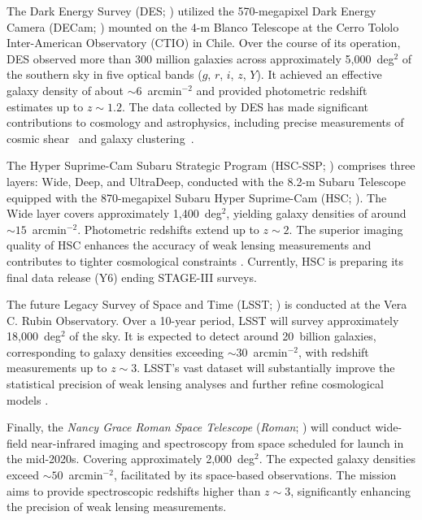 The Dark Energy Survey (DES; \citealt{2005astro.ph.10346T, 2018ApJS..239...18A, 2021ApJS..255...20A}) utilized the 570-megapixel Dark Energy Camera (DECam; \citealt{2015AJ....150..150F}) mounted on the 4-m Blanco Telescope at the Cerro Tololo Inter-American Observatory (CTIO) in Chile. Over the course of its operation, DES observed more than 300 million galaxies across approximately 5,000~deg$^2$ of the southern sky in five optical bands ($g$, $r$, $i$, $z$, $Y$). It achieved an effective galaxy density of about $\sim 6$~arcmin$^{-2}$ and provided photometric redshift estimates up to $z \sim 1.2$. The data collected by DES has made significant contributions to cosmology and astrophysics, including precise measurements of cosmic shear~\citep{2022PhRvD.105b3514A} and galaxy clustering~\citep{2022PhRvD.105b3520A}. 

The Hyper Suprime-Cam Subaru Strategic Program (HSC-SSP; \citealt{2018PASJ...70S...4A}) comprises three layers: Wide, Deep, and UltraDeep, conducted with the 8.2-m Subaru Telescope equipped with the 870-megapixel Subaru Hyper Suprime-Cam (HSC; \citealt{2018PASJ...70S...1M}). The Wide layer covers approximately 1,400~deg$^2$, yielding galaxy densities of around $\sim 15$~arcmin$^{-2}$. Photometric redshifts extend up to $z \sim 2$. The superior imaging quality of HSC enhances the accuracy of weak lensing measurements and contributes to tighter cosmological constraints \citep{2019PASJ...71...43H}. Currently, HSC is preparing its final data release (Y6) ending STAGE-III surveys.

The future Legacy Survey of Space and Time (LSST; \citealt{2009arXiv0912.0201L, 2019ApJ...873..111I}) is conducted at the Vera C. Rubin Observatory. Over a 10-year period, LSST will survey approximately 18,000~deg$^2$ of the sky. It is expected to detect around 20~billion galaxies, corresponding to galaxy densities exceeding $\sim 30$~arcmin$^{-2}$, with redshift measurements up to $z \sim 3$. LSST's vast dataset will substantially improve the statistical precision of weak lensing analyses and further refine cosmological models \citep{2012arXiv1211.0310L}.

Finally, the \textit{Nancy Grace Roman Space Telescope} (\emph{Roman}; \citealt{2015arXiv150303757S}) will conduct wide-field near-infrared imaging and spectroscopy from space scheduled for launch in the mid-2020s. Covering approximately 2,000~deg$^2$. The expected galaxy densities exceed $\sim 50$~arcmin$^{-2}$, facilitated by its space-based observations. The mission aims to provide spectroscopic redshifts higher than $z \sim 3$, significantly enhancing the precision of weak lensing measurements.

